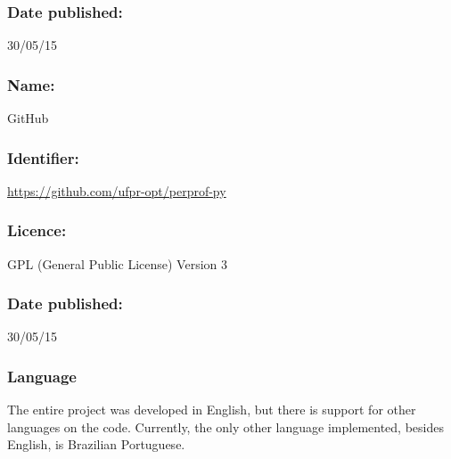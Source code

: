     \subsubsection*{Date published:} 30/05/15

\CodeRepository

    \subsubsection*{Name:} GitHub

    \subsubsection*{Identifier:} \url{https://github.com/ufpr-opt/perprof-py}

    \subsubsection*{Licence:} GPL (General Public License) Version 3

    \subsubsection*{Date published:} 30/05/15

\subsubsection*{Language}

    The entire project was developed in English, but there is support for
    other languages on the code. Currently, the only other language implemented, besides English, is Brazilian Portuguese.

